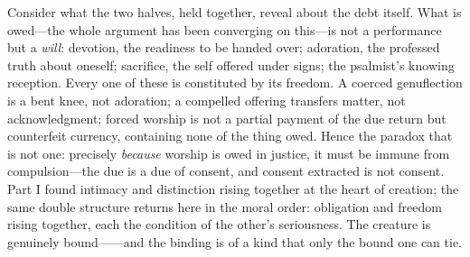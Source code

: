 Consider what the two halves, held together, reveal about the debt itself. What is owed---the whole argument has been converging on this---is not a performance but a \emph{will}: devotion, the readiness to be handed over; adoration, the professed truth about oneself; sacrifice, the self offered under signs; the psalmist's knowing reception. Every one of these is constituted by its freedom. A coerced genuflection is a bent knee, not adoration; a compelled offering transfers matter, not acknowledgment; forced worship is not a partial payment of the due return but counterfeit currency, containing none of the thing owed. Hence the paradox that is not one: precisely \emph{because} worship is owed in justice, it must be immune from compulsion---the due is a due of consent, and consent extracted is not consent. Part I found intimacy and distinction rising together at the heart of creation; the same double structure returns here in the moral order: obligation and freedom rising together, each the condition of the other's seriousness. The creature is genuinely bound------and the binding is of a kind that only the bound one can tie.
